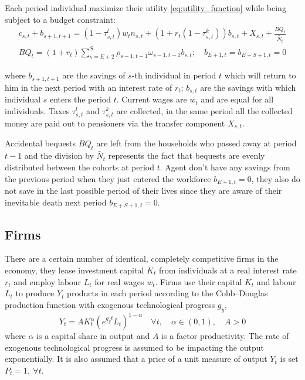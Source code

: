 Each period individual maximize their utility \textcolor{Fuchsia}{\eqref{eq:utility_function}} while being subject to a budget constraint:
\begin{equation}\label{eq:budget_constraint}
    \begin{aligned}
        c_{s,t}+b_{s+1, t+1} = (1-\tau^l_{s,t})w_t n_{s,t} + (1+r_t(1-\tau^k_{s,t}))b_{s,t} + X_{s,t} + \frac{BQ_t}{\tilde{N_t}}
        \\
        BQ_t = (1+r_t) \sum^S_{s=E+2}\rho_{s-1, t-1}\omega_{s-1,t-1}b_{s,t}; \quad b_{E+1, t} = b_{E+S+1, t} = 0
    \end{aligned}
\end{equation}

\noindent where $b_{s+1, t+1}$ are the savings of $s$-th individual in period $t$ which will return to him in the next period with an interest rate of $r_t$; $b_{s, t}$ are the savings with which individual $s$ enters the period $t$. Current wages are $w_t$ and are equal for all individuals. Taxes $\tau^l_{s,t}$ and $\tau^k_{s,t}$ are collected, in the same period all the collected money are paid out to pensioners via the transfer component $X_{s,t}$.

Accidental bequests $BQ_t$ are left from the households who passed away at period $t-1$ and the division by $\tilde{N_t}$ represents the fact that bequests are evenly distributed between the cohorts at period $t$. Agent don't have any savings from the previous period when they just entered the workforce $b_{E+1, t}=0$, they also do not save in the last possible period of their lives since they are aware of their inevitable death next period $b_{E+S+1, t} = 0$.


\subsection{Firms}
\label{subsec:firms}

There are a certain number of identical, completely competitive firms in the economy, they lease investment capital $K_t$ from individuals at a real interest rate $r_t$ and employ labour $L_t$ for real wages $w_t$. Firms use their capital $K_t$ and labour $L_t$ to produce $Y_t$ products in each period according to the Cobb–Douglas production function with exogenous technological progress $g_y$,
\begin{equation}\label{eq:production_function}
    Y_t=AK_t^{\alpha}(e^{g_y t}L_t)^{1-\alpha} \quad \forall t, \quad \alpha \in (0, 1), \quad A>0
\end{equation}
where $\alpha$ is a capital share in output and $A$ is a factor productivity. The rate of exogenous technological progress is assumed to be impacting the output exponentially. It is also assumed that a price of a unit measure of output $Y_t$ is set $P_t = 1, \ \forall t$.

